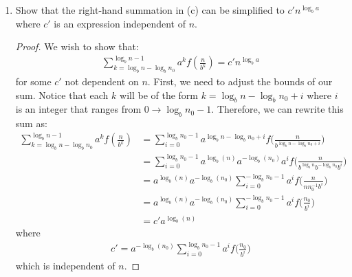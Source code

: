 \documentclass[11pt]{article}
\begin{document}
\begin{enumerate}
\begin{enumerate}
\noindent
for some constant $y$ independent of $n$.  What is this $y$?\\ \\
$y=\log_b(n_0)$.
\begin{proof}
This is evident from our use of logarithm rules.  $\log_b(\frac{n}{n_0}) = \log_b(n) - \log_b(n_0)$, therefore we can rewrite the summation in \textbf{(a)} to be:
\begin{align*}
\sum_{k=0}^{\log_b(\frac{n}{n_0})-1} a^k f\bigl( \frac{n}{b^k} \bigr) = \sum_{k = 0}^{\log_b n - 1} a^k f(n/b^k) - 
  \sum_{k = \log_b n - \log_b n_0}^{\log_b n - 1} a^k f(n/b^k) 
\end{align*}
This is also evident, because we wish to remove all the terms between levels $\log_b(\frac{n}{n_0})$ and $\log_b(n)$.  That is, for all levels smaller than the base case $n_0$.
\end{proof}
\item Show that the right-hand summation in (c) can be simplified to $c'
n^{\log_b a}$ where $c'$ is an expression independent of $n$.  
\begin{proof} We wish to show that:
\begin{align*}
\sum_{k = \log_b n - \log_b n_0 }^{\log_b n - 1} a^k f(\frac{n}{b^k}) = c'n^{\log_b a}
\end{align*}
for some $c'$ not dependent on $n$.  First, we need to adjust the bounds of our sum.  Notice that each $k$ will be of the form $k = \log_b n - \log_b n_0 +i$ where $i$ is an integer that ranges from $0 \to \log_b n_0-1$.  Therefore, we can rewrite this sum as: 
\begin{align*}
\sum_{k = \log_b n - \log_b n_0 }^{\log_b n - 1} a^k f(\frac{n}{b^k}) &= 
\sum_{i=0}^{\log_b n_0 -1} a^{\log_b n - \log_b n_0 +i }f\bigl(\frac{n}{b^{\log_b n -\log_b n_0 +i}}\bigr)\\
&= \sum_{i=0}^{\log_b n_0 -1}a^{\log_b(n)}a^{-\log_b(n_0)}a^i f\bigl(\frac{n}{b^{\log_b n}b^{-\log_b n_0} b^i}\bigr) \\
&= a^{\log_b(n)}a^{-\log_b(n_0)} \sum_{i=0}^{-\log_b n_0 -1}a^i f \bigl(\frac{n}{n n_0^{-1} b^i}\bigr) \\
&= a^{\log_b(n)}a^{-\log_b(n_0)} \sum_{i=0}^{-\log_b n_0 -1}a^i f \bigl(\frac{n_0}{b^i}\bigr) \\
&= c'a^{\log_b(n)}
\end{align*}
where
\begin{align*}
c'= a^{-\log_b(n_0)} \sum_{i=0}^{\log_b n_0 -1}a^i f \bigl(\frac{n_0}{b^i}\bigr)
\end{align*}
which is independent of $n$.
\end{proof}
\end{enumerate}
\end{enumerate}
\end{document}
